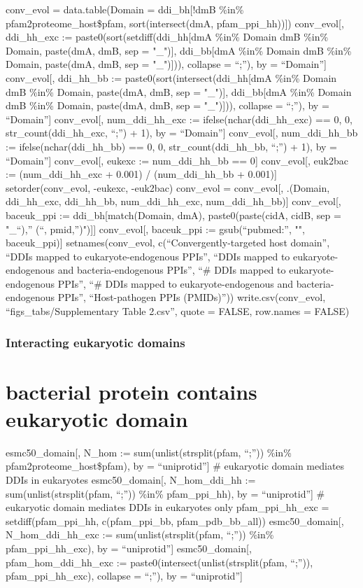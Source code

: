 \documentclass[
]{article}
\begin{document}
conv\_evol = data.table(Domain = ddi\_bh{[}!dmB \%in\%
pfam2proteome\_host\$pfam, sort(intersect(dmA, pfam\_ppi\_hh)){]})
conv\_evol{[}, ddi\_hh\_exc := paste0(sort(setdiff(ddi\_hh{[}dmA \%in\%
Domain \textbar{} dmB \%in\% Domain, paste(dmA, dmB, sep = "\_"){]},
ddi\_bb{[}dmA \%in\% Domain \textbar{} dmB \%in\% Domain, paste(dmA,
dmB, sep = "\_"){]})), collapse = ``;''), by = ``Domain''{]}
conv\_evol{[}, ddi\_hh\_bb := paste0(sort(intersect(ddi\_hh{[}dmA \%in\%
Domain \textbar{} dmB \%in\% Domain, paste(dmA, dmB, sep = "\_"){]},
ddi\_bb{[}dmA \%in\% Domain \textbar{} dmB \%in\% Domain, paste(dmA,
dmB, sep = "\_"){]})), collapse = ``;''), by = ``Domain''{]}
conv\_evol{[}, num\_ddi\_hh\_exc := ifelse(nchar(ddi\_hh\_exc) == 0, 0,
str\_count(ddi\_hh\_exc, ``;'') + 1), by = ``Domain''{]} conv\_evol{[},
num\_ddi\_hh\_bb := ifelse(nchar(ddi\_hh\_bb) == 0, 0,
str\_count(ddi\_hh\_bb, ``;'') + 1), by = ``Domain''{]} conv\_evol{[},
eukexc := num\_ddi\_hh\_bb == 0{]} conv\_evol{[}, euk2bac :=
(num\_ddi\_hh\_exc + 0.001) / (num\_ddi\_hh\_bb + 0.001){]}
setorder(conv\_evol, -eukexc, -euk2bac) conv\_evol = conv\_evol{[},
.(Domain, ddi\_hh\_exc, ddi\_hh\_bb, num\_ddi\_hh\_exc,
num\_ddi\_hh\_bb){]} conv\_evol{[}, baceuk\_ppi :=
ddi\_bh{[}match(Domain, dmA), paste0(paste(cidA, cidB, sep = "\_``),''
(``, pmid,'')"){]}{]} conv\_evol{[}, baceuk\_ppi := gsub(``pubmed:'',
"", baceuk\_ppi){]} setnames(conv\_evol, c(``Convergently-targeted host
domain'', ``DDIs mapped to eukaryote-endogenous PPIs'', ``DDIs mapped to
eukaryote-endogenous and bacteria-endogenous PPIs'', ``\# DDIs mapped to
eukaryote-endogenous PPIs'', ``\# DDIs mapped to eukaryote-endogenous
and bacteria-endogenous PPIs'', ``Host-pathogen PPIs (PMIDs)''))
write.csv(conv\_evol, ``figs\_tabs/Supplementary Table 2.csv'', quote =
FALSE, row.names = FALSE)

\hypertarget{interacting-eukaryotic-domains}{%
\subsubsection{Interacting eukaryotic
domains}\label{interacting-eukaryotic-domains}}

\hypertarget{bacterial-protein-contains-eukaryotic-domain}{%
\section{bacterial protein contains eukaryotic
domain}\label{bacterial-protein-contains-eukaryotic-domain}}

esmc50\_domain{[}, N\_hom := sum(unlist(strsplit(pfam, ``;'')) \%in\%
pfam2proteome\_host\$pfam), by = ``uniprotid''{]} \# eukaryotic domain
mediates DDIs in eukaryotes esmc50\_domain{[}, N\_hom\_ddi\_hh :=
sum(unlist(strsplit(pfam, ``;'')) \%in\% pfam\_ppi\_hh), by =
``uniprotid''{]} \# eukaryotic domain mediates DDIs in eukaryotes only
pfam\_ppi\_hh\_exc = setdiff(pfam\_ppi\_hh, c(pfam\_ppi\_bb,
pfam\_pdb\_bb\_all)) esmc50\_domain{[}, N\_hom\_ddi\_hh\_exc :=
sum(unlist(strsplit(pfam, ``;'')) \%in\% pfam\_ppi\_hh\_exc), by =
``uniprotid''{]} esmc50\_domain{[}, pfam\_hom\_ddi\_hh\_exc :=
paste0(intersect(unlist(strsplit(pfam, ``;'')), pfam\_ppi\_hh\_exc),
collapse = ``;''), by = ``uniprotid''{]}
\end{document}
